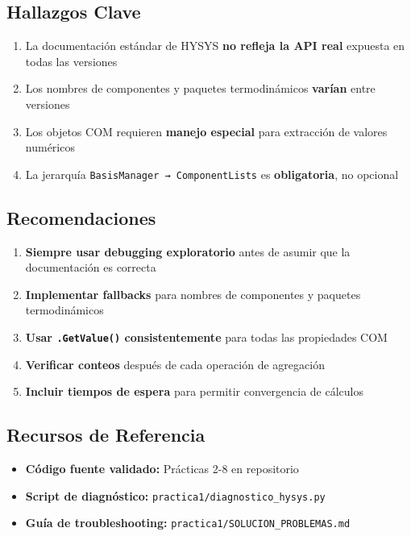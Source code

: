 \documentclass[12pt,a4paper]{article}
\begin{document}
\subsection{Hallazgos Clave}

\begin{enumerate}
    \item La documentación estándar de HYSYS \textbf{no refleja la API real} expuesta en todas las versiones
    \item Los nombres de componentes y paquetes termodinámicos \textbf{varían} entre versiones
    \item Los objetos COM requieren \textbf{manejo especial} para extracción de valores numéricos
    \item La jerarquía \texttt{BasisManager → ComponentLists} es \textbf{obligatoria}, no opcional
\end{enumerate}

\subsection{Recomendaciones}

\begin{enumerate}
    \item \textbf{Siempre usar debugging exploratorio} antes de asumir que la documentación es correcta
    \item \textbf{Implementar fallbacks} para nombres de componentes y paquetes termodinámicos
    \item \textbf{Usar \texttt{.GetValue()} consistentemente} para todas las propiedades COM
    \item \textbf{Verificar conteos} después de cada operación de agregación
    \item \textbf{Incluir tiempos de espera} para permitir convergencia de cálculos
\end{enumerate}

\subsection{Recursos de Referencia}

\begin{itemize}
    \item \textbf{Código fuente validado:} Prácticas 2-8 en repositorio
    \item \textbf{Script de diagnóstico:} \texttt{practica1/diagnostico\_hysys.py}
    \item \textbf{Guía de troubleshooting:} \texttt{practica1/SOLUCION\_PROBLEMAS.md}
\end{itemize}
\end{document}
